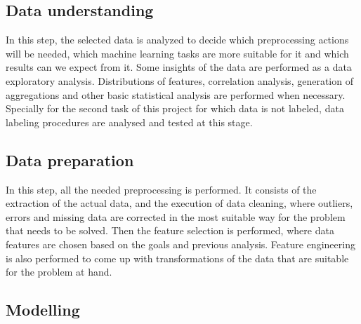 \subsection{Data understanding}

In this step, the selected data is analyzed to decide which preprocessing actions will be needed, which machine learning tasks are more suitable for it and which results can we expect from it. 
Some insights of the data are performed as a data exploratory analysis. Distributions of features, correlation analysis, generation of aggregations and other basic statistical analysis are performed when necessary.
Specially for the second task of this project for which data is not labeled, data labeling procedures are analysed and tested at this stage.

\subsection{Data preparation}

In this step, all the needed preprocessing is performed. It consists of the extraction of the actual data, and the execution of data cleaning, where outliers, errors and missing data are corrected in the most suitable way for the problem that needs to be solved. Then the feature selection is performed, where data features are chosen based on the goals and previous analysis. Feature engineering is also performed to come up with transformations of the data that are suitable for the problem at hand.


\subsection{Modelling}

